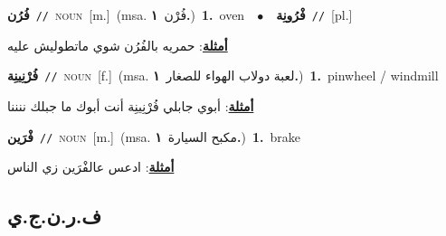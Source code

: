 \documentclass[10pt,a4paper,twoside]{article} %
\begin{document}
\begin{multicols}{2}
{\setlength\topsep{0pt}\textbf{\foreignlanguage{arabic}{فُرُن}}\ {\color{gray}\texttt{//}\color{black}}\ \textsc{noun}\ [m.]\ \color{gray}(msa. \foreignlanguage{arabic}{فُرْن}~\foreignlanguage{arabic}{\textbf{١.}})\color{black}\ \textbf{1.}~oven\ \ $\bullet$\ \ \setlength\topsep{0pt}\textbf{\foreignlanguage{arabic}{فْرُونِة}}\ {\color{gray}\texttt{//}\color{black}}\ [pl.]\  \begin{flushright}\color{gray}\foreignlanguage{arabic}{\textbf{\underline{\foreignlanguage{arabic}{أمثلة}}}: حمريه بالفُرُن شوي ماتطوليش عليه}\end{flushright}\color{black}} \vspace{2mm}

{\setlength\topsep{0pt}\textbf{\foreignlanguage{arabic}{فُرْنِينِة}}\ {\color{gray}\texttt{//}\color{black}}\ \textsc{noun}\ [f.]\ \color{gray}(msa. \foreignlanguage{arabic}{لعبة دولاب الهواء للصغار}~\foreignlanguage{arabic}{\textbf{١.}})\color{black}\ \textbf{1.}~pinwheel / windmill\  \begin{flushright}\color{gray}\foreignlanguage{arabic}{\textbf{\underline{\foreignlanguage{arabic}{أمثلة}}}: أبوي جابلي فُرْنِينِة أنت أبوك ما جبلك ننننا}\end{flushright}\color{black}} \vspace{2mm}

{\setlength\topsep{0pt}\textbf{\foreignlanguage{arabic}{فْرَين}}\ {\color{gray}\texttt{//}\color{black}}\ \textsc{noun}\ [m.]\ \color{gray}(msa. \foreignlanguage{arabic}{مكبح السيارة}~\foreignlanguage{arabic}{\textbf{١.}})\color{black}\ \textbf{1.}~brake\  \begin{flushright}\color{gray}\foreignlanguage{arabic}{\textbf{\underline{\foreignlanguage{arabic}{أمثلة}}}: ادعس عالفْرَين زي الناس}\end{flushright}\color{black}} \vspace{2mm}

\vspace{-3mm}
\subsection*{\color{blue}\foreignlanguage{arabic}{ف.ر.ن.ج.ي}\color{blue}{ (ntws)}} 


\end{multicols}
\end{document}
